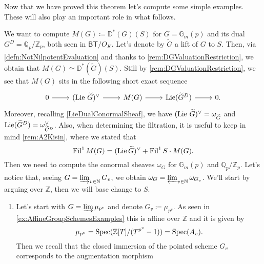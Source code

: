 \noindent
Now that we have proved this theorem let's compute some simple examples.
These will also play an important role in what follows.
\begin{ex}[]\label{DieudonneModulesSimpleExamples}
	We want to compute $M(G) \coloneqq \mathbb{D}^*(G)(S)$ for
	$G = \mathbb{G}_m(p)$ and its dual 
	$G^D = \underline{\mathbb{Q}_p/\mathbb{Z}_{p}}$,
	both seen in $\mathsf{BT}/O_K$.
	Let's denote by $\widetilde{G}$ a lift of $G$ to $S$.
	Then, via \cref{defn:NotNilpotentEvaluation} and thanks to \cref{rem:DGValuationRestriction},
	we obtain that $M(G) \simeq \mathbb{D}^*(\widetilde{G})(S)$.
	Still by \cref{rem:DGValuationRestriction}, we see that $M(G)$
	sits in the following short exact sequence
	\begin{equation}\label{eqn:MGSES}
	\begin{tikzcd}
		0 \arrow[r, "", rightarrow] &
		( \lie\, \widetilde{G} )^\vee \arrow[r, "", rightarrow] &
		M(G) \arrow[r, "", rightarrow] &
		\lie(\widetilde{G}^D) \arrow[r, "", rightarrow] &
		0
	.\end{tikzcd}
	\end{equation}
	Moreover, recalling \cref{LieDualConormalSheaf}, we have
	$(\operatorname{Lie}\, \widetilde{G})^\vee = \omega_{\widetilde{G}}$ and
	$\operatorname{Lie}(\widetilde{G}^D) = \omega_{\widetilde{G}^D}^\vee$.
	Also, when determining the filtration, it is useful to keep
	in mind \cref{rem:A2Kisin}, where we stated that 
	\begin{equation*}
		\operatorname{Fil}^1 M(G) =
		( \operatorname{Lie} \widetilde{G} )^\vee +
		\operatorname{Fil}^1S \cdot M(G)
	.\end{equation*}
	Then we need to compute the conormal sheaves $\omega_G$ for $\mathbb{G}_m(p)$
	and $\underline{\mathbb{Q}_p/\mathbb{Z}_{p}}$.
	Let's notice that, seeing $G = \varinjlim_{v \in \mathbb{N}} G_v$, we
	obtain $\omega_G = \varprojlim_{v \in \mathbb{N}} \omega_{G_v}$.
	We'll start by arguing over $\mathbb{Z}$, then we will base change
	to $S$.
\begin{enumerate}
	\item Let's start with $G = \varinjlim \mu_{p^v}$ and denote $G_v \coloneqq \mu_{p^v}$.
		As seen in \cref{ex:AffineGroupSchemesExamples} this is affine over
		$\mathbb{Z}$ and it is given by
		\begin{equation*}
			\mu_{p^v} = \operatorname{Spec}(\mathbb{Z}[T]/ (T^{p^v} - 1)) = \operatorname{Spec}(A_v)
		.\end{equation*}
		Then we recall that the closed immersion of the pointed
		scheme $G_v$ corresponds to the augmentation morphism
		\begin{equation*}

\end{equation*}
\end{enumerate}
\end{ex}
